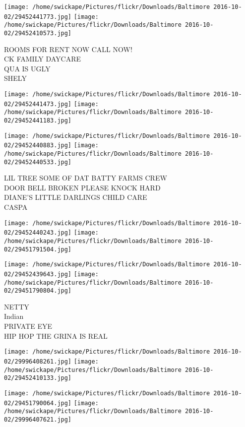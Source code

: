 \documentclass[10pt,letterpaper]{article}
\begin{document}
\texttt{[image: /home/swickape/Pictures/flickr/Downloads/Baltimore 2016-10-02/29452441773.jpg]}
\texttt{[image: /home/swickape/Pictures/flickr/Downloads/Baltimore 2016-10-02/29452410573.jpg]}

ROOMS FOR RENT NOW CALL NOW!\\
CK FAMILY DAYCARE\\
QUA IS UGLY\\
SHELY
\pagebreak

\texttt{[image: /home/swickape/Pictures/flickr/Downloads/Baltimore 2016-10-02/29452441473.jpg]}
\texttt{[image: /home/swickape/Pictures/flickr/Downloads/Baltimore 2016-10-02/29452441183.jpg]}

\texttt{[image: /home/swickape/Pictures/flickr/Downloads/Baltimore 2016-10-02/29452440883.jpg]}
\texttt{[image: /home/swickape/Pictures/flickr/Downloads/Baltimore 2016-10-02/29452440533.jpg]}

LIL TREE SOME OF DAT BATTY FARMS CREW\\
DOOR BELL BROKEN PLEASE KNOCK HARD\\
DIANE'S LITTLE DARLINGS CHILD CARE\\
CASPA
\pagebreak

\texttt{[image: /home/swickape/Pictures/flickr/Downloads/Baltimore 2016-10-02/29452440243.jpg]}
\texttt{[image: /home/swickape/Pictures/flickr/Downloads/Baltimore 2016-10-02/29451791504.jpg]}

\texttt{[image: /home/swickape/Pictures/flickr/Downloads/Baltimore 2016-10-02/29452439643.jpg]}
\texttt{[image: /home/swickape/Pictures/flickr/Downloads/Baltimore 2016-10-02/29451790804.jpg]}

NETTY\\
Indian\\
PRIVATE EYE\\
HIP HOP THE GRINA IS REAL
\pagebreak

\texttt{[image: /home/swickape/Pictures/flickr/Downloads/Baltimore 2016-10-02/29996408261.jpg]}
\texttt{[image: /home/swickape/Pictures/flickr/Downloads/Baltimore 2016-10-02/29452410133.jpg]}

\texttt{[image: /home/swickape/Pictures/flickr/Downloads/Baltimore 2016-10-02/29451790064.jpg]}
\texttt{[image: /home/swickape/Pictures/flickr/Downloads/Baltimore 2016-10-02/29996407621.jpg]}
\end{document}
